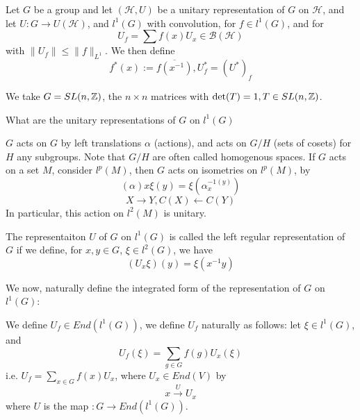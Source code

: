 Let $G$ be a group and let $(\mathcal{H}, U)$ be a unitary representation of $G$ on $\mathcal{H}$, and let $U: G\to U(\mathcal{H})$, and $l^1(G)$ with convolution, for $f\in l^1(G)$, and for 
\begin{equation*}
    U_f=\sum f(x)U_x\in\mathcal{B}(\mathcal{H})
\end{equation*}
with $\|U_f\|\leq\|f\|_{L^1}$. We then define
\begin{equation*}
    f^*(x):=\overline{f(x^{-1})}, U_f^*=(U^*)_f
\end{equation*}

We take $G=SL(n, \mathbb{Z})$, the $n\times n$ matrices with $\det(T)=1, T\in SL(n,\mathbb{Z})$. 

\begin{problem}
    What are the unitary representations of $G$ on $l^1(G)$
\end{problem}
$G$ acts on $G$ by left translations $\alpha$ (actions), and acts on $G/H$ (sets of cosets) for $H$ any subgroups. Note that $G/H$ are often called homogenous spaces. If $G$ acts on a set $M$, consider $l^p(M)$, then $G$ acts on isometries on $l^p(M)$, by
\begin{equation*}
    (\alpha)x\xi(y)=\xi(\alpha_x^{-1(y)})
\end{equation*}
\begin{equation*}
    X\rightarrow Y, C(X)\leftarrow C(Y)
\end{equation*}
In particular, this action on $l^2(M)$ is unitary.

\begin{definition}
    The representaiton $U$ of $G$ on $l^1(G)$ is called the left regular representation of $G$ if we define, for $x,y\in G$, $\xi\in l^2(G)$, we have
    \begin{equation*}
        (U_x\xi)(y)=\xi(x^{-1}y)
    \end{equation*}
\end{definition}

We now, naturally define the integrated form of the representation of $G$ on $l^1(G)$:
\begin{definition}
    We define $U_f\in End(l^1(G))$, we define $U_f$ naturally as follows: let $\xi\in l^1(G)$, and 
    \begin{equation*}
        U_f(\xi)=\sum_{g\in G}f(g)U_x(\xi)
    \end{equation*}
    i.e. $U_f=\sum_{x\in G}f(x)U_x$, where $U_x\in End(V)$ by
    \begin{equation*}
        x\xrightarrow{U}U_x
    \end{equation*}
    where $U$ is the map $: G\to End(l^1(G))$.
\end{definition}

